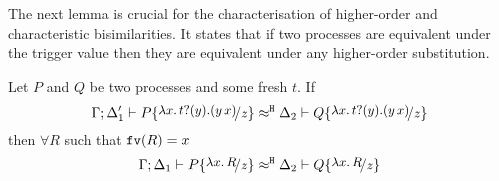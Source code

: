 %
%

The next lemma is crucial for the characterisation of
higher-order and characteristic bisimilarities.
It states that if two processes are equivalent under the
trigger value %
then they are equivalent under any higher-order substitution.

\begin{lemma}
	\label{lem:proc_subst}
	Let $P$ and $Q$ be two processes and some fresh $t$. If 
%
			\[\horel{\Gamma}{\Delta_1'}{P \subst{\trvalx{t}}{z}}{\hwb}{\Delta_2}{Q \subst{\trvalx{t}}{z}}\]
%
%
	then $\forall R$ such that $\mathtt{fv}(R) = x$
	\[
		\horel{\Gamma}{\Delta_1}{P \subst{\abs{x}{R}}{z}}{\hwb}{\Delta_2}{Q \subst{\abs{x}{R}}{z}}
	\]
\end{lemma}

